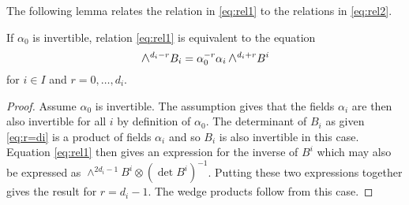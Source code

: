 \documentclass{amsart}
\theoremstyle{definition}
\newcommand{\Wedge}{\mbox{\scalebox{1.2}{$\wedge$}}}
\newcommand\VW{V_W}
\begin{document}






The following lemma relates the relation in \eqref{eq:rel1} to the relations in \eqref{eq:rel2}.

\begin{lemma}
If $\alpha_0$ is invertible, relation \eqref{eq:rel1} is equivalent to the equation
$$\Wedge^{d_i-r} B_i  = \alpha_0^{-r} \alpha_i\, \Wedge^{d_i+r} B^i$$
for $i\in I$ and $r=0,\ldots,d_i$.
\end{lemma}

\begin{proof}
Assume $\alpha_0$ is invertible.
The assumption gives that the fields $\alpha_i$ are then also invertible for all $i$ by definition of $\alpha_0$.
The determinant of $B_i$ as given \eqref{eq:r=di} is a product of fields $\alpha_i$ and so $B_i$ is also invertible in this case.
Equation \eqref{eq:rel1} then gives an expression for the inverse of $B^i$ which may also be expressed as $\wedge^{2d_i-1} B^i \otimes (\det B^i)^{-1}$.
Putting these two expressions together gives the result for $r=d_i-1$.
The wedge products follow from this case.
\end{proof}
\end{document}
